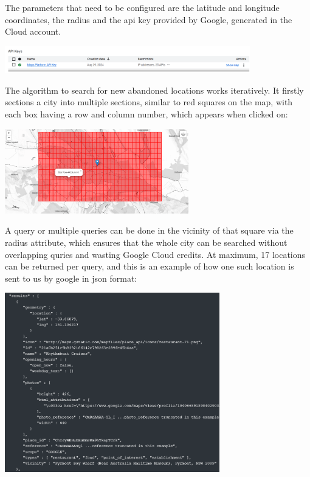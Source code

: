 \documentclass[12pt,a4paper]{report}
\begin{document}
The parameters that need to be configured are the latitude and longitude coordinates, the radius and the api key provided by Google, generated in the Cloud account.

\begin{center}
\includegraphics[width=0.8\textwidth]{images/google.png}
\end{center}

The algorithm to search for new abandoned locations works iteratively. It firstly sections a city into multiple sections, similar to red squares on the map, with each box having a row and column number, which appears when clicked on:

\begin{center}
\includegraphics[width=0.6\textwidth]{images/grid.png}
\end{center}

A query or multiple queries can be done in the vicinity of that square via the radius attribute, which ensures that the whole city can be searched without overlapping quries and wasting Google Cloud credits. At maximum, 17 locations can be returned per query, and this is an example of how one such location is sent to us by google in json format:

\begin{center}
\includegraphics[width=0.7\textwidth]{images/json.png}
\end{center}
\end{document}
